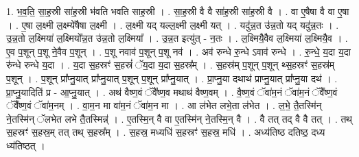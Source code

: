 \documentclass[17pt]{extarticle}
\begin{document}
1. भ॒व॒ति॒ सा॒ह॒स्री सा॑ह॒स्री भ॑वति भवति साह॒स्री । . सा॒ह॒स्री वै वै सा॑ह॒स्री सा॑ह॒स्री वै । . वा ए॒षैषा वै वा ए॒षा । . ए॒षा ल॒क्ष्मी ल॒क्ष्म्ये॑षैषा ल॒क्ष्मी । . ल॒क्ष्मी यद् यल्ल॒क्ष्मी ल॒क्ष्मी यत् । . यदु॑न्न॒त उ॑न्न॒तो यद् यदु॑न्न॒तः । . उ॒न्न॒तो ल॒क्ष्मिया॑ ल॒क्ष्मियो᳚न्न॒त उ॑न्न॒तो ल॒क्ष्मिया᳚ । . उ॒न्न॒त इत्यु॑त् - न॒तः । . ल॒क्ष्मियै॒वैव ल॒क्ष्मिया॑ ल॒क्ष्मियै॒व । . ए॒व प॒शून् प॒शू ने॒वैव प॒शून् । . प॒शू नवाव॑ प॒शून् प॒शू नव॑ । . अव॑ रुन्धे रु॒न्धे ऽवाव॑ रुन्धे । . रु॒न्धे॒ य॒दा य॒दा रु॑न्धे रुन्धे य॒दा । . य॒दा स॒हस्रꣳ॑ स॒हस्रं॑ ॅय॒दा य॒दा स॒हस्र᳚म् । . स॒हस्र॑म् प॒शून् प॒शून् थ्स॒हस्रꣳ॑ स॒हस्र॑म् प॒शून् । . प॒शून् प्रा᳚प्नु॒यात् प्रा᳚प्नु॒यात् प॒शून् प॒शून् प्रा᳚प्नु॒यात् । . प्रा॒प्नु॒या दथाथ॑ प्राप्नु॒यात् प्रा᳚प्नु॒या दथ॑ । . प्रा॒प्नु॒यादिति॑ प्र - आ॒प्नु॒यात् । . अथ॑ वैष्ण॒वं ॅवै᳚ष्ण॒व मथाथ॑ वैष्ण॒वम् । . वै॒ष्ण॒वं ॅवा॑म॒नं ॅवा॑म॒नं ॅवै᳚ष्ण॒वं ॅवै᳚ष्ण॒वं ॅवा॑म॒नम् । . वा॒म॒न मा वा॑म॒नं ॅवा॑म॒न मा । . आ ल॑भेत लभे॒ता ल॑भेत । . ल॒भे॒ तै॒तस्मि॑न् ने॒तस्मि॑न् ॅलभेत लभे तै॒तस्मिन्न्॑ । . ए॒तस्मि॒न् वै वा ए॒तस्मि॑न् ने॒तस्मि॒न् वै । . वै तत् तद् वै वै तत् । . तथ् स॒हस्रꣳ॑ स॒हस्र॒म् तत् तथ् स॒हस्र᳚म् । . स॒हस्र॒ मध्यधि॑ स॒हस्रꣳ॑ स॒हस्र॒ मधि॑ । . अध्य॑तिष्ठ दतिष्ठ॒ दध्य ध्य॑तिष्ठत् । \newline
\end{document}
